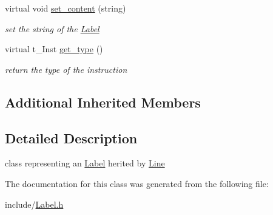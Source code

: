 \begin{DoxyCompactItemize}
\mbox{\label{class_label_a16f1db5a51a093f3963a2d902bce845f}} 
virtual void \mbox{\hyperlink{class_label_a16f1db5a51a093f3963a2d902bce845f}{set\+\_\+content}} (string)
\begin{DoxyCompactList}\small\item\em set the string of the \mbox{\hyperlink{class_label}{Label}} \end{DoxyCompactList}\item 
\mbox{\label{class_label_af123355b73ac457171c3118052d145ac}} 
virtual t\+\_\+\+Inst \mbox{\hyperlink{class_label_af123355b73ac457171c3118052d145ac}{get\+\_\+type}} ()
\begin{DoxyCompactList}\small\item\em return the type of the instruction \end{DoxyCompactList}\end{DoxyCompactItemize}
\subsection*{Additional Inherited Members}


\subsection{Detailed Description}
class representing an \mbox{\hyperlink{class_label}{Label}} herited by \mbox{\hyperlink{class_line}{Line}} 

The documentation for this class was generated from the following file\+:\begin{DoxyCompactItemize}
\item 
include/\mbox{\hyperlink{_label_8h}{Label.\+h}}\end{DoxyCompactItemize}
